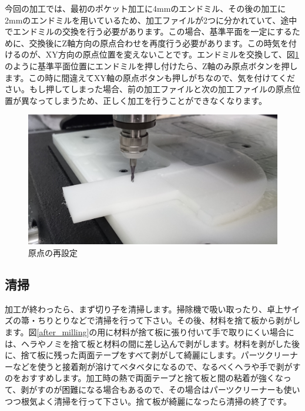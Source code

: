 \documentclass[b5paper, 9pt, twocolumn, titlepage,openany]{jsbook}%
\begin{document}

\clearpage
今回の加工では、最初のポケット加工に4mmのエンドミル、その後の加工に2mmのエンドミルを用いているため、加工ファイルが2つに分かれていて、途中でエンドミルの交換を行う必要があります。この場合、基準平面を一定にするために、交換後にZ軸方向の原点合わせを再度行う必要があります。この時気を付けるのが、XY方向の原点位置を変えないことです。エンドミルを交換して、図\ref{zeropoint_again}のように基準平面位置にエンドミルを押し付けたら、Z軸のみ原点ボタンを押します。この時に間違えてXY軸の原点ボタンも押しがちなので、気を付けてください。もし押してしまった場合、前の加工ファイルと次の加工ファイルの原点位置が異なってしまうため、正しく加工を行うことができなくなります。\\

\begin{figure}[tbh]
  \begin{center}
    \begin{minipage}{0.6\columnwidth}
      \includegraphics[width=\columnwidth]{zeropoint_again.jpg}
    \end{minipage}
    \caption{原点の再設定\label{zeropoint_again}}
  \end{center}
\end{figure}


\subsection{清掃}
加工が終わったら、まず切り子を清掃します。掃除機で吸い取ったり、卓上サイズの箒・ちりとりなどで清掃を行って下さい。その後、材料を捨て板から剥がします。図\ref{after_milling}の用に材料が捨て板に張り付いて手で取りにくい場合には、ヘラやノミを捨て板と材料の間に差し込んで剥がします。材料を剥がした後に、捨て板に残った両面テープをすべて剥がして綺麗にします。パーツクリーナーなどを使うと接着剤が溶けてベタベタになるので、なるべくヘラや手で剥がすのをおすすめします。加工時の熱で両面テープと捨て板と間の粘着が強くなって、剥がすのが困難になる場合もあるので、その場合はパーツクリーナーも使いつつ根気よく清掃を行って下さい。捨て板が綺麗になったら清掃の終了です。\\
\end{document}
